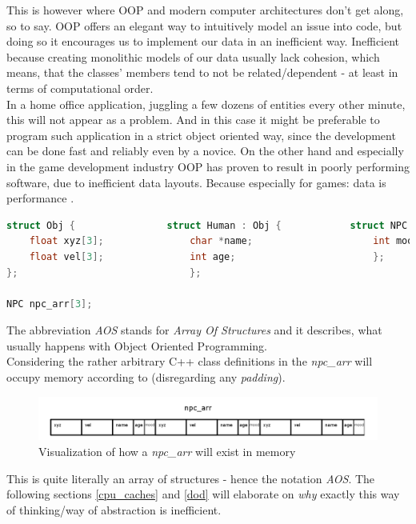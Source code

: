  This is however where OOP and modern computer architectures don't get along, so to say. OOP offers an elegant way to intuitively model an issue into code, but doing so it encourages us to implement our data in an inefficient way. Inefficient because creating monolithic models of our data usually lack cohesion, which means, that the classes' members tend to not be related/dependent  - at least in terms of computational order.\\
 In a home office application, juggling a few dozens of entities every other minute, this will not appear as a problem. And in this case it might be preferable to program such application in a strict object oriented way, since the development can be done fast and reliably even by a novice. On the other hand and especially in the game development industry OOP has proven to result in poorly performing software, due to inefficient data layouts. Because especially for games: data is performance .\\
 \begin{lstlisting}[language=C++,numbers=none,name={Example of some hierarchical POD class definitions},label={pods}]
struct Obj {				struct Human : Obj {			struct NPC : Human {
	float xyz[3];				char *name;						int mood;
	float vel[3];				int age;						};
};								};

NPC npc_arr[3];
 \end{lstlisting}
The abbreviation \textit{AOS} stands for \textit{Array Of Structures} and it describes, what usually happens with Object Oriented Programming.\\
Considering the rather arbitrary C++ class definitions in  the \textit{npc\_arr} will occupy memory according to  (disregarding any \textit{padding}).
\begin{figure}[!htbp]
	\centering
	\includegraphics[width=1.0\linewidth]{PICs/npcs_in_memory}
	\caption{Visualization of how a \textit{npc\_arr} will exist in memory}\label{npcs_in_memory}
\end{figure}
This is quite literally an array of structures - hence the notation \textit{AOS}. The following sections \ref{cpu_caches} and \ref{dod} will elaborate on \textit{why} exactly this way of thinking/way of abstraction is inefficient.




